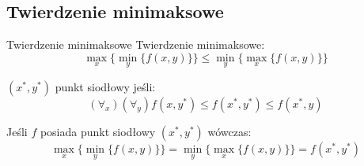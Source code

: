 \documentclass[xcolor=x11names,compress]{beamer}
\renewcommand{\(}{\begin{columns}}
\renewcommand{\)}{\end{columns}}
\newcommand{\<}[1]{\begin{column}{#1}}
\renewcommand{\>}{\end{column}}
\begin{document}
\subsection{Twierdzenie minimaksowe}
\begin{frame}{Twierdzenie minimaksowe}
Twierdzenie minimaksowe:
$$\max_x \{ \min_{y} \{ f(x,y) \} \} \leq \min_{y} \{ \max_x \{ f(x,y) \} \}$$

$(x^*,y^*)$ punkt siodłowy jeśli:
$$(\forall_{x})(\forall_{y}) f(x,y^*) \leq f(x^*,y^*) \leq f(x^*,y)$$

Jeśli $f$ posiada punkt siodłowy $(x^*,y^*)$ wówczas:
$$\max_x \{ \min_{y} \{ f(x,y) \} \} = \min_{y} \{ \max_x \{ f(x,y) \} \} = f(x^*,y^*)$$
\end{frame}
\end{document}
